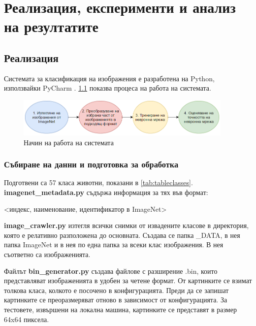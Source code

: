 \chapter{Реализация, експерименти и анализ на резултатите}

\label{Chapter4}


\section{Реализация}

Системата за класификация на изображения е разработена на Python, използвайки PyCharm \cite{Pycharm}. \ref{fig:ProcessFlow} показва процеса на работа на системата.

\begin{figure}[H]
\centering
\includegraphics[width=400px]{Figures/ProcessFlow.PNG}
\caption{Начин на работа на системата}
\label{fig:ProcessFlow}
\end{figure}

\subsection{Събиране на данни и подготовка за обработка}

Подготвени са 57 класа животни, показани в \ref{tab:tableclasses}. \textbf{imagenet\_metadata.py} съдържа информация за тях във формат:

\begin{center}
<индекс, наименование, идентификатор в ImageNet>
\end{center}

\textbf{image\_crawler.py} изтегля всички снимки от извадените класове в директория, която е релативно разположена до основната. Създава се папка \_DATA, в нея папка ImageNet и в нея по една папка за всеки клас изображения. В нея съответно са изображенията.

Файлът \textbf{bin\_generator.py} създава файлове с разширение .bin, които представляват изображенията в удобен за четене формат. От картинките се взимат толкова класа, колкото е посочено в конфигурацията. Преди да се запишат картинките се преоразмеряват отново в зависимост от конфигурацията. За тестовете, извършени на локална машина, картинките се представят в размер 64x64 пиксела.

